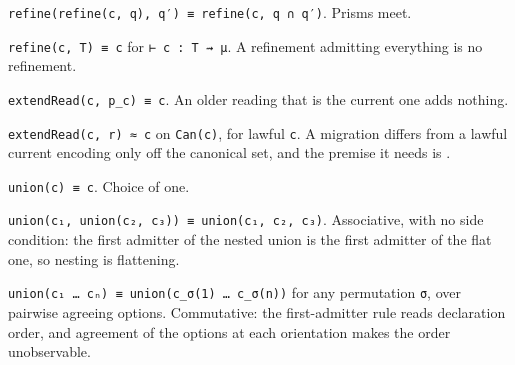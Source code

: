 \begin{theorem}
\label{eq:refine-meet}
\leanok
\texttt{refine(refine(c,\ q),\ q′)\ ≡\ refine(c,\ q\ ∩\ q′)}. Prisms meet.
\end{theorem}

\begin{theorem}
\label{eq:refine-full}
\leanok
\texttt{refine(c,\ T)\ ≡\ c} for \texttt{⊢\ c\ :\ T\ ⇝\ μ}. A refinement admitting everything is no
refinement.
\end{theorem}

\begin{theorem}
\label{eq:legacy-self}
\leanok
\texttt{extendRead(c,\ p\_c)\ ≡\ c}. An older reading that is the current one adds nothing.
\end{theorem}

\begin{theorem}
\label{eq:legacy-can}
\leanok
\texttt{extendRead(c,\ r)\ ≈\ c} on \texttt{Can(c)}, for lawful \texttt{c}. A migration differs from a
lawful current encoding only off the canonical set, and the premise it needs is .
\end{theorem}

\begin{theorem}
\label{eq:union-single}
\leanok
\texttt{union(c)\ ≡\ c}. Choice of one.
\end{theorem}

\begin{theorem}
\label{eq:union-assoc}
\leanok
\texttt{union(c₁,\ union(c₂,\ c₃))\ ≡\ union(c₁,\ c₂,\ c₃)}. Associative, with no side condition: the first
admitter of the nested union is the first admitter of the flat one, so nesting is flattening.
\end{theorem}

\begin{theorem}
\label{eq:union-perm}
\leanok
\texttt{union(c₁\ …\ cₙ)\ ≡\ union(c\_σ(1)\ …\ c\_σ(n))} for any permutation \texttt{σ}, over pairwise
agreeing options. Commutative: the first-admitter rule reads declaration order, and agreement of
the options at each orientation makes the order unobservable.
\end{theorem}

